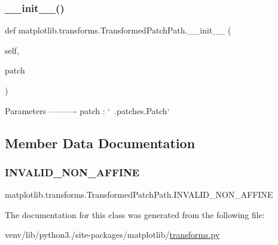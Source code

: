 \subsubsection{\texorpdfstring{\+\_\+\+\_\+init\+\_\+\+\_\+()}{\_\_init\_\_()}}
{\footnotesize\ttfamily def matplotlib.\+transforms.\+Transformed\+Patch\+Path.\+\_\+\+\_\+init\+\_\+\+\_\+ (\begin{DoxyParamCaption}\item[{}]{self,  }\item[{}]{patch }\end{DoxyParamCaption})}

\begin{DoxyVerb}Parameters
----------
patch : `~.patches.Patch`
\end{DoxyVerb}
 

\subsection{Member Data Documentation}
\mbox{\label{classmatplotlib_1_1transforms_1_1TransformedPatchPath_a49d1d185fb906b03139739e3694966c6}} 
\subsubsection{\texorpdfstring{I\+N\+V\+A\+L\+I\+D\+\_\+\+N\+O\+N\+\_\+\+A\+F\+F\+I\+NE}{INVALID\_NON\_AFFINE}}
{\footnotesize\ttfamily matplotlib.\+transforms.\+Transformed\+Patch\+Path.\+I\+N\+V\+A\+L\+I\+D\+\_\+\+N\+O\+N\+\_\+\+A\+F\+F\+I\+NE}



The documentation for this class was generated from the following file\+:\begin{DoxyCompactItemize}
\item 
venv/lib/python3./site-\/packages/matplotlib/\hyperlink{transforms_8py}{transforms.\+py}\end{DoxyCompactItemize}
